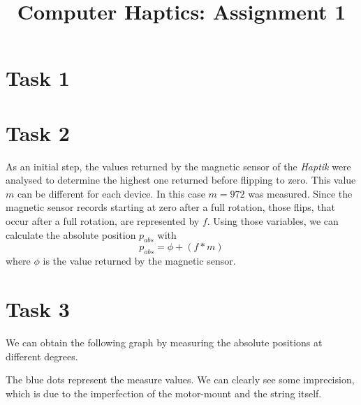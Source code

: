 



  \title{Computer Haptics: Assignment 1}
  \maketitle

  \section*{Task 1}

  \section*{Task 2}

  As an initial step, the values returned by the magnetic sensor of the \textit{Haptik} were analysed to determine the highest one returned before flipping to zero. This value $m$ can be different for each device. In this case $m = 972$ was measured. Since the magnetic sensor records starting at zero after a full rotation, those flips, that occur after a full rotation, are represented by $f$. Using those variables, we can calculate the absolute position $p_{abs}$ with
  \begin{equation*}
    p_{abs} = \phi + (f * m)
  \end{equation*}
  where $\phi$ is the value returned by the magnetic sensor.

  \section*{Task 3}

  We can obtain the following graph by measuring the absolute positions at different degrees.

  \begin{figure}[H]
    \centering
  \end{figure}
  
  The blue dots represent the measure values. We can clearly see some imprecision, which is due to the imperfection of the motor-mount and the string itself.

